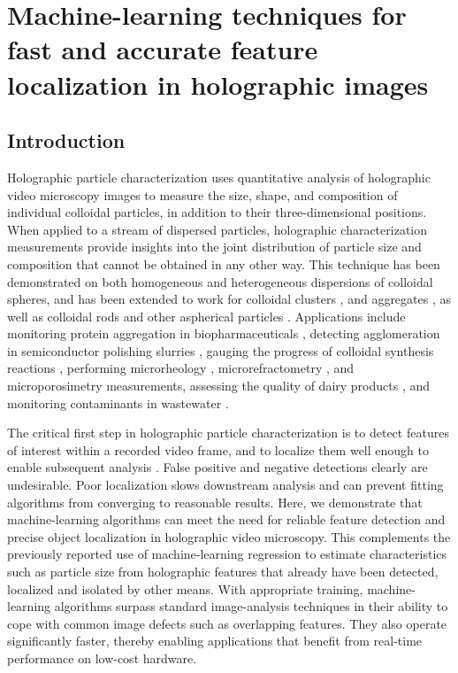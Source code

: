 \chapter{Machine-learning techniques for fast and accurate feature localization in holographic images}
\label{ch:cascade}


\section{Introduction}


Holographic particle characterization \cite{lee07a} uses 
quantitative analysis of holographic video microscopy images to 
measure the size, shape, and composition of individual colloidal
particles, in addition to their three-dimensional positions.
When applied to a stream of dispersed particles, holographic
characterization measurements provide insights into the
joint distribution of particle size and composition
that cannot be obtained in any other way.
This technique has been demonstrated on both homogeneous
and heterogeneous \cite{yevick14,philips17}
dispersions of colloidal spheres, and has been extended to work for 
colloidal clusters \cite{perry12,fung12,fung13}, and aggregates 
\cite{wang16,wang16a}, as well as colloidal rods \cite{cheong10} 
and other aspherical particles \cite{wang14using,hannel15}.
Applications include
monitoring protein aggregation in biopharmaceuticals \cite{wang16},
detecting agglomeration in semiconductor polishing slurries
\cite{cheong17}, 
gauging the progress of colloidal synthesis reactions \cite{wang15,wang15a},
performing microrheology \cite{cheong08}, 
microrefractometry \cite{shpaisman12}, 
and microporosimetry \cite{cheong11} measurements,
assessing the quality of dairy products \cite{cheong09a},
and monitoring contaminants 
in wastewater \cite{philips17}.

The critical first step in holographic particle characterization
is to detect features of interest within a recorded video frame,
and to localize them well enough to enable subsequent 
analysis  \cite{crocker96,cheong09,yevick14,krishnatreya14a}.
False positive and negative detections clearly are undesirable.
Poor localization slows downstream analysis
\cite{yevick14,krishnatreya14a} and can prevent fitting algorithms 
from converging to reasonable results.
Here, we demonstrate that machine-learning algorithms can meet the
need for reliable feature detection and precise object localization in
holographic video microscopy.
This complements the previously reported \cite{yevick14}
use of machine-learning regression to estimate
characteristics such as particle size from holographic
features that already have been detected, localized
and isolated by other means.
With appropriate training, machine-learning algorithms
surpass standard image-analysis
techniques in their ability to cope with common image defects
such as overlapping features.
They also operate significantly faster, thereby enabling
applications that benefit from real-time performance on low-cost
hardware.

